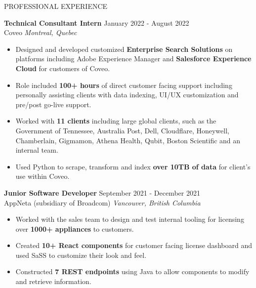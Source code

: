 

\begin{rSection}{PROFESSIONAL EXPERIENCE}

\textbf{Technical Consultant Intern} \hfill January 2022 - August 2022\\
Coveo \hfill \textit{Montreal, Quebec}
 \begin{itemize}
    \itemsep -6pt {}
        \item Designed and developed customized \textbf{Enterprise Search Solutions} on platforms including Adobe Experience Manager and \textbf{Salesforce Experience Cloud} for customers of Coveo.
        \item Role included \textbf{100+ hours} of direct customer facing support including personally assisting clients with data indexing, UI/UX customization and pre/post go-live support.
        \item Worked with \textbf{11 clients} including large global clients, such as the Government of Tennessee, Australia Post, Dell, Cloudflare, Honeywell, Chamberlain, Gigmamon, Athena Health, Qubit, Boston Scientific and an internal team.
        \item Used Python to scrape, transform and index \textbf{over 10TB of data}  for client's use within Coveo.
 \end{itemize}

\textbf{Junior Software Developer} \hfill September 2021 - December 2021\\
AppNeta (subsidiary of Broadcom) \hfill \textit{Vancouver, British Columbia}
 \begin{itemize}
    \itemsep -6pt {}
        \item Worked with the sales team to design and test internal tooling for licensing over \textbf{1000+ appliances} to customers.
        \item Created \textbf{10+ React components} for customer facing license dashboard and used SaSS to customize their look and feel.
        \item Constructed \textbf{7 REST endpoints} using Java to allow components to modify and retrieve information.
 \end{itemize}
 

\end{rSection}
